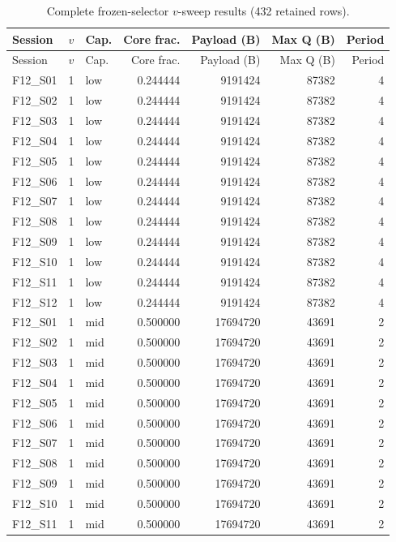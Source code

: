 \begin{longtable}{lllr r r r}
\caption{Complete frozen-selector $v$-sweep results (432 retained rows).}\label{tab:vsweepfull}\\
\toprule
Session & $v$ & Cap. & Core frac. & Payload (B) & Max Q (B) & Period \\
\midrule
\endfirsthead
\toprule
Session & $v$ & Cap. & Core frac. & Payload (B) & Max Q (B) & Period \\
\midrule
\endhead
F12\_S01 & 1 & low & 0.244444 & 9191424 & 87382 & 4 \\
F12\_S02 & 1 & low & 0.244444 & 9191424 & 87382 & 4 \\
F12\_S03 & 1 & low & 0.244444 & 9191424 & 87382 & 4 \\
F12\_S04 & 1 & low & 0.244444 & 9191424 & 87382 & 4 \\
F12\_S05 & 1 & low & 0.244444 & 9191424 & 87382 & 4 \\
F12\_S06 & 1 & low & 0.244444 & 9191424 & 87382 & 4 \\
F12\_S07 & 1 & low & 0.244444 & 9191424 & 87382 & 4 \\
F12\_S08 & 1 & low & 0.244444 & 9191424 & 87382 & 4 \\
F12\_S09 & 1 & low & 0.244444 & 9191424 & 87382 & 4 \\
F12\_S10 & 1 & low & 0.244444 & 9191424 & 87382 & 4 \\
F12\_S11 & 1 & low & 0.244444 & 9191424 & 87382 & 4 \\
F12\_S12 & 1 & low & 0.244444 & 9191424 & 87382 & 4 \\
F12\_S01 & 1 & mid & 0.500000 & 17694720 & 43691 & 2 \\
F12\_S02 & 1 & mid & 0.500000 & 17694720 & 43691 & 2 \\
F12\_S03 & 1 & mid & 0.500000 & 17694720 & 43691 & 2 \\
F12\_S04 & 1 & mid & 0.500000 & 17694720 & 43691 & 2 \\
F12\_S05 & 1 & mid & 0.500000 & 17694720 & 43691 & 2 \\
F12\_S06 & 1 & mid & 0.500000 & 17694720 & 43691 & 2 \\
F12\_S07 & 1 & mid & 0.500000 & 17694720 & 43691 & 2 \\
F12\_S08 & 1 & mid & 0.500000 & 17694720 & 43691 & 2 \\
F12\_S09 & 1 & mid & 0.500000 & 17694720 & 43691 & 2 \\
F12\_S10 & 1 & mid & 0.500000 & 17694720 & 43691 & 2 \\
F12\_S11 & 1 & mid & 0.500000 & 17694720 & 43691 & 2 \\

\end{longtable}
